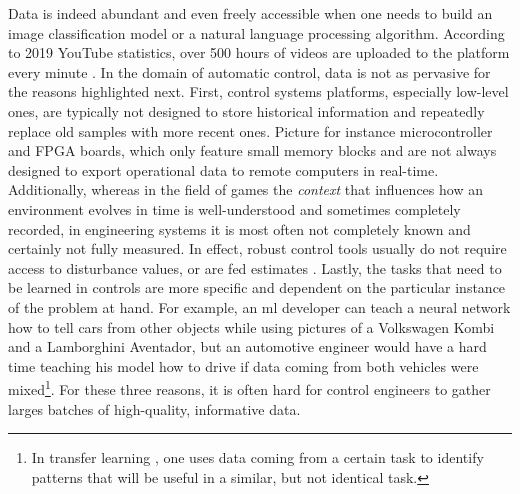 Data is indeed abundant and even freely accessible when one needs to build an image classification model or a natural language processing algorithm. According to 2019 YouTube statistics, over 500 hours of videos are uploaded to the platform every minute \citep{hale2019}.  
In the domain of automatic control, data is not as pervasive for the reasons highlighted next.
First, control systems platforms, especially low-level ones, are typically not designed to store historical information and repeatedly replace old samples with more recent ones. Picture for instance microcontroller and FPGA boards, which only feature small memory blocks and are not always designed to export operational data to remote computers in real-time. Additionally, whereas in the field of games the \textit{context} that influences how an environment evolves in time is well-understood and sometimes completely recorded, in engineering systems it is most often not completely known and certainly not fully measured. In effect, robust control tools usually do not require access to disturbance values, or are fed estimates \citep{zhou1998essentials,pannocchia2015offset}. Lastly, the tasks that need to be learned in controls are more specific and dependent on the particular instance of the problem at hand. For example, an \ac{ml} developer can teach a neural network how to tell cars from other objects while using pictures of a Volkswagen Kombi and a Lamborghini Aventador, but an automotive engineer would have a hard time teaching his model how to drive if data coming from both vehicles were mixed\footnote{In transfer learning \citep{pan2010survey}, one uses data coming from a certain task to identify patterns that will be useful in a similar, but not identical task.}.  For these three reasons, it is often hard for control engineers to gather larges batches of high-quality, informative data.

